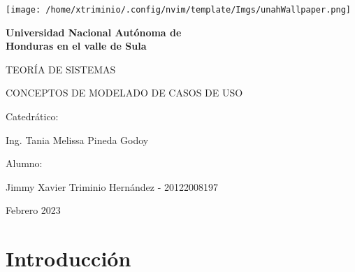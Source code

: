 \documentclass[12pt]{article}
\begin{document}
\begin{titlepage}

  \begin{center}
    {\texttt{[image: /home/xtriminio/.config/nvim/template/Imgs/unahWallpaper.png]}\par}

    
  
    {\bfseries\Huge Universidad Nacional Autónoma de\\
                     Honduras en el valle de Sula \par}
  
    \vspace{1cm}
  
    {\scshape\huge TEORÍA DE SISTEMAS\par}
  
    \vspace{1cm}
  
    {\scshape\Large CONCEPTOS DE MODELADO DE CASOS DE USO}
  
    \vfill 
    {\large Catedrático:\par} %
    {\large Ing. Tania Melissa Pineda Godoy \par} %
  
    \vfill
    {\large Alumno: \par}
    {\large Jimmy Xavier Triminio Hernández - 20122008197 \par}

    \vfill
    {\large Febrero 2023\par} %

  \end{center}

\end{titlepage}

\newpage
\tableofcontents

\vspace{1cm}
\section{ Introducción }
\end{document}

